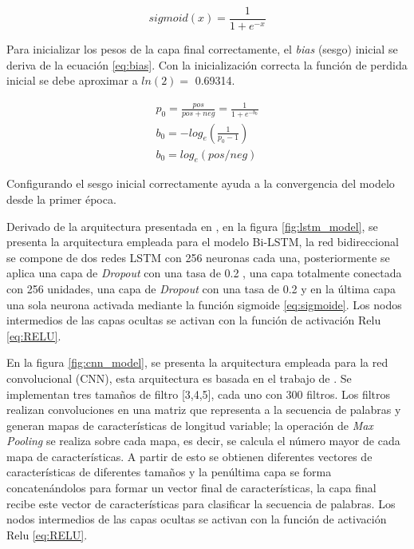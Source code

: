 \begin{equation}
    \label{eq:sigmoide}
    sigmoid(x) = \frac{1}{1+ e^{-x}}
\end{equation}

Para inicializar los pesos de la capa final correctamente, el \textit{bias} (sesgo) inicial se deriva de la ecuación \ref{eq:bias}.  Con la inicialización correcta la función de perdida inicial se debe aproximar a $ln(2)=$ 0.69314. 

\begin{equation}
\label{eq:bias}
\begin{split}
    p_0= \frac{pos}{pos+neg}= \frac{1}{1+e^{-b_0}}\\
    b_0=-log_e(\frac{1}{p_0-1})\\
    b_0=log_e(pos/neg)
\end{split}
\end{equation}

Configurando el sesgo inicial correctamente ayuda a la convergencia del modelo desde la primer época.

Derivado de la arquitectura presentada en  \citep{adhikari2019rethinking}, en la figura  \ref{fig:lstm_model}, se presenta la arquitectura empleada para el modelo Bi-LSTM, la red bidireccional se compone de dos redes LSTM con 256 neuronas cada una, posteriormente se aplica una capa de \textit{Dropout} con una tasa de 0.2 , una capa totalmente conectada con 256 unidades, una capa de \textit{Dropout} con una tasa de 0.2 y en la última capa una sola neurona activada mediante la función sigmoide \ref{eq:sigmoide}. Los nodos intermedios de las capas ocultas se activan con la función de activación Relu \ref{eq:RELU}. 


En la figura \ref{fig:cnn_model}, se presenta la arquitectura empleada para la red convolucional (CNN), esta arquitectura es basada en el trabajo de \citep{kim2014convolutional}. Se implementan tres tamaños de filtro [3,4,5], cada uno con 300 filtros. Los filtros realizan convoluciones en una matriz que representa a la secuencia de palabras y generan mapas de características de longitud variable; la operación de \textit{Max Pooling }se realiza sobre cada mapa, es decir, se calcula el número mayor de cada mapa de características. A partir de esto se obtienen diferentes vectores de características de diferentes tamaños y la penúltima capa se forma concatenándolos para formar un vector final de características, la capa final recibe este vector de características para clasificar la secuencia de palabras. Los nodos intermedios de las capas ocultas se activan con la función de activación Relu \ref{eq:RELU}. 

